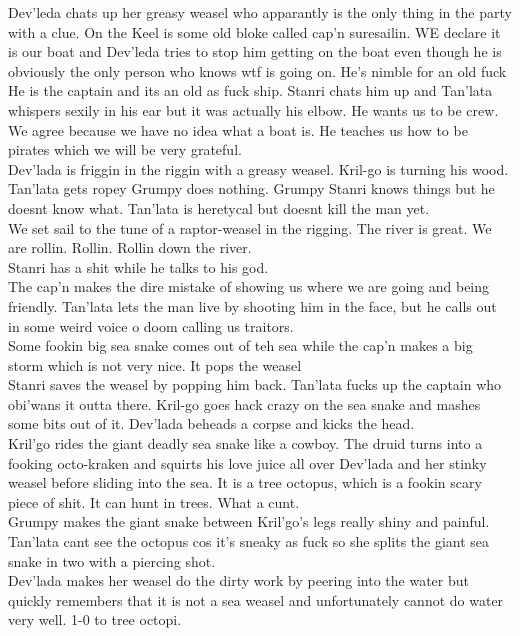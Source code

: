 Dev’leda chats up her greasy weasel who apparantly is the only thing in the party with a clue. On the Keel is some old bloke called cap’n suresailin. WE declare it is our boat and Dev’leda tries to stop him getting on the boat even though he is obviously the only person who knows wtf is going on. He’s nimble for an old fuck\\
He is the captain and its an old as fuck ship. Stanri chats him up and Tan’lata whispers sexily in his ear but it was actually his elbow. He wants us to be crew. We agree because we have no idea what a boat is. He teaches us how to be pirates which we will be very grateful.\\
Dev’lada is friggin in the riggin with a greasy weasel. Kril-go is turning his wood. Tan’lata gets ropey Grumpy does nothing. Grumpy Stanri knows things but he doesnt know what. Tan’lata is heretycal but doesnt kill the man yet.\\
We set sail to the tune of a raptor-weasel in the rigging. The river is great. We are rollin. Rollin. Rollin down the river.\\
Stanri has a shit while he talks to his god.\\
The cap’n makes the dire mistake of showing us where we are going and being friendly. Tan’lata lets the man live by shooting him in the face, but he calls out in some weird voice o doom calling us traitors.\\
Some fookin big sea snake comes out of teh sea while the cap’n makes a big storm which is not very nice. It pops the weasel\\
Stanri saves the weasel by popping him back. Tan’lata fucks up the captain who obi’wans it outta there. Kril-go goes hack crazy on the sea snake and mashes some bits out of it. Dev’lada beheads a corpse and kicks the head.\\
Kril’go rides the giant deadly sea snake like a cowboy. The druid turns into a fooking octo-kraken and squirts his love juice all over Dev’lada and her stinky weasel before sliding into the sea. It is a tree octopus, which is a fookin scary piece of shit. It can hunt in trees. What a cunt.\\
Grumpy makes the giant snake between Kril’go’s legs really shiny and painful. Tan’lata cant see the octopus cos it’s sneaky as fuck so she splits the giant sea snake in two with a piercing shot.\\
Dev’lada makes her weasel do the dirty work by peering into the water but quickly remembers that it is not a sea weasel and unfortunately cannot do water very well. 1-0 to tree octopi.\\
